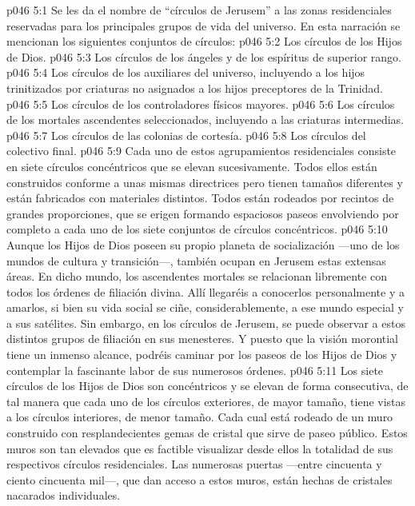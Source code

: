 \vs p046 5:1 Se les da el nombre de “círculos de Jerusem” a las zonas residenciales reservadas para los principales grupos de vida del universo. En esta narración se mencionan los siguientes conjuntos de círculos:
\vs p046 5:2 Los círculos de los Hijos de Dios.
\vs p046 5:3 Los círculos de los ángeles y de los espíritus de superior rango.
\vs p046 5:4 Los círculos de los auxiliares del universo, incluyendo a los hijos trinitizados por criaturas no asignados a los hijos preceptores de la Trinidad.
\vs p046 5:5 Los círculos de los controladores físicos mayores.
\vs p046 5:6 Los círculos de los mortales ascendentes seleccionados, incluyendo a las criaturas intermedias.
\vs p046 5:7 Los círculos de las colonias de cortesía.
\vs p046 5:8 Los círculos del colectivo final.
\vs p046 5:9 \pc Cada uno de estos agrupamientos residenciales consiste en siete círculos concéntricos que se elevan sucesivamente. Todos ellos están construidos conforme a unas mismas directrices pero tienen tamaños diferentes y están fabricados con materiales distintos. Todos están rodeados por recintos de grandes proporciones, que se erigen formando espaciosos paseos envolviendo por completo a cada uno de los siete conjuntos de círculos concéntricos.
\vs p046 5:10  Aunque los Hijos de Dios poseen su propio planeta de socialización ---uno de los mundos de cultura y transición---, también ocupan en Jerusem estas extensas áreas. En dicho mundo, los ascendentes mortales se relacionan libremente con todos los órdenes de filiación divina. Allí llegaréis a conocerlos personalmente y a amarlos, si bien su vida social se ciñe, considerablemente, a ese mundo especial y a sus satélites. Sin embargo, en los círculos de Jerusem, se puede observar a estos distintos grupos de filiación en sus menesteres. Y puesto que la visión morontial tiene un inmenso alcance, podréis caminar por los paseos de los Hijos de Dios y contemplar la fascinante labor de sus numerosos órdenes.
\vs p046 5:11 Los siete círculos de los Hijos de Dios son concéntricos y se elevan de forma consecutiva, de tal manera que cada uno de los círculos exteriores, de mayor tamaño, tiene vistas a los círculos interiores, de menor tamaño. Cada cual está rodeado de un muro construido con resplandecientes gemas de cristal que sirve de paseo público. Estos muros son tan elevados que es factible visualizar desde ellos la totalidad de sus respectivos círculos residenciales. Las numerosas puertas ---entre cincuenta y ciento cincuenta mil---, que dan acceso a estos muros, están hechas de cristales nacarados individuales.
